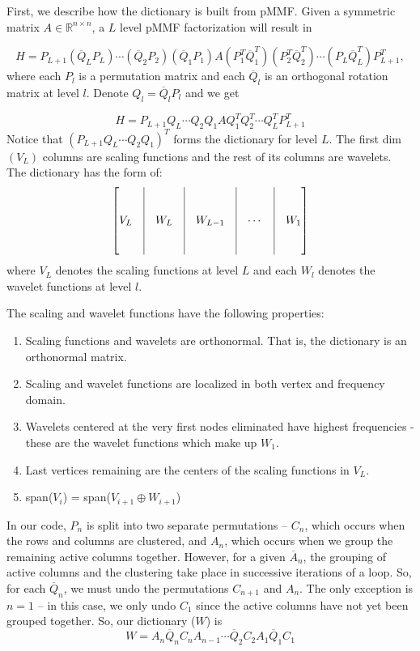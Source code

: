 \documentclass[a4paper]{article}
\newcommand{\R}{\mathbb{R}}
\begin{document}
First, we describe how the dictionary is built from pMMF. Given a symmetric matrix $A \in \R^{n\times n}$, a $L$ level pMMF factorization will result in 

$$H = P_{L+1} (\overline{Q}_L P_L) \cdots (\overline{Q}_2 P_2) (\overline{Q}_1 P_1) A (P_1^{T} \overline{Q}_1^{T}) (P_2^{T} \overline{Q}_2^T) \cdots (P_{L} \overline{Q}_L^{T}) P_{L+1}^T,$$
where each $P_l$ is a permutation matrix and each $\overline{Q}_l$ is an orthogonal rotation matrix at level $l$.
Denote $Q_l = \overline{Q}_l P_l$ and we get

$$H = P_{L+1} Q_L \cdots Q_2 Q_1 A Q_1^T Q_2^T \cdots Q_L^T P_{L+1}^T$$
Notice that $(P_{L+1} Q_L \cdots Q_2 Q_1)^T$ forms the dictionary for level $L$. The first dim$(V_L)$ columns are scaling functions and the rest of its columns are wavelets. The dictionary has the form of:
\[\begin{bmatrix}
& \vline & & \vline & & \vline & & \vline  \\
& \vline & & \vline & & \vline & & \vline \\
V_L & \vline & W_L & \vline & W_{L-1} & \vline & \cdots & \vline & W_1  \\
& \vline & & \vline & & \vline & & \vline \\
& \vline & & \vline & & \vline & & \vline \\
\end{bmatrix}\]
where $V_L$ denotes the scaling functions at level $L$ and each $W_l$ denotes the wavelet functions at level $l$.

\smallskip
The scaling and  wavelet functions have the following properties:
\begin{enumerate}
\item Scaling functions and wavelets are orthonormal. That is, the dictionary is an orthonormal matrix.
\item Scaling and wavelet functions are localized in both vertex and frequency domain.
\item Wavelets centered at the very first nodes eliminated have highest frequencies - these are the wavelet functions which make up $W_1$.
\item Last vertices remaining are the centers of the scaling functions in $V_L$.
\item span($V_i$) = span($V_{i+1} \oplus W_{i+1}$)
\end{enumerate}
\smallskip
In our code, $P_n$ is split into two separate permutations -- $C_n$, which occurs when the rows and columns are clustered, and $A_n$, which occurs when we group the remaining active columns together. However, for a given $\overline{A}_n$, the grouping of active columns and the clustering take place in successive iterations of a loop. So, for each $\overline{Q}_n$, we must undo the permutations $C_{n+1}$ and $A_n$. The only exception is $n = 1$ -- in this case, we only undo $C_1$ since the active columns have not yet been grouped together. So, our dictionary ($W$) is $$W = A_n\overline{Q}_nC_nA_{n-1}\cdots\overline{Q}_2C_2A_1\overline{Q}_1C_1$$
\end{document}

